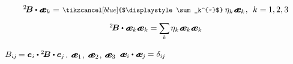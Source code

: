 \nopagebreak\vspace{-0.25em}\begin{equation*}\begin{array}{c}
\somebivalenttensor \dotp \mathboldae_k = \hspace{.2ex} \scalebox{.82}{$\tikzcancel[blue]{$\displaystyle\sum_k^{~}$}$}\: \eigenvalue_{\hspace{-0.15ex}k} \hspace{.1ex} \mathboldae_k \hspace{.1ex}, \:\: k =\hspace{-0.1ex} 1, 2, 3
\\[.9em]
%
\somebivalenttensor \dotp \tikzmark{BeginEqualsEBrace} {\mathboldae_k \mathboldae_k} \tikzmark{EndEqualsEBrace} = \hspace{-0.1ex} \scalebox{.9}{$\displaystyle \sum_{\smash{k}}$} \hspace{.2ex} \eigenvalue_{\hspace{-0.15ex}k} \hspace{.1ex} \mathboldae_k \mathboldae_k
\end{array}\end{equation*}

\vspace{-0.25em}
${%
\somebivalenttensorcomponents{i\hspace{-0.1ex}j}
\hspace{-0.2ex} =
\bm{e}_i \dotp \somebivalenttensor \dotp \bm{e}_{\hspace{-0.1ex}j} }$.
${\mathboldae_1}$, ${\mathboldae_2}$, ${\mathboldae_3}$
${\mathboldae_i \dotp \mathboldae_{\hspace{-0.1ex}j} \hspace{-0.15ex} = \delta_{i\hspace{-0.1ex}j}}$


